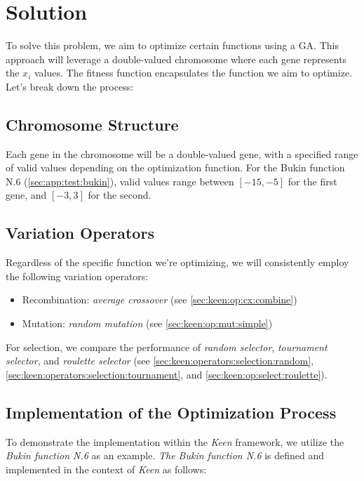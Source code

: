 \section{Solution}
\label{sec:fn_opt:sol}
    To solve this problem, we aim to optimize certain functions using a GA. This approach will leverage a double-valued 
    chromosome where each gene represents the \(x_i\) values. The fitness function encapsulates the function we aim to 
    optimize. Let's break down the process:

    \subsection{Chromosome Structure}
        Each gene in the chromosome will be a double-valued gene, with a specified 
        range of valid values depending on the optimization function. For the Bukin 
        function N.6 (\vref{sec:app:test:bukin}), valid values range between 
        \([-15, -5]\) for the first gene, and \([-3, 3]\) for the second.

    \subsection{Variation Operators}
        Regardless of the specific function we're optimizing, we will consistently 
        employ the following variation operators:

        \begin{itemize}
        \item Recombination: \textit{average crossover} (see 
            \vref{sec:keen:op:cx:combine})
        \item Mutation: \textit{random mutation} (see 
            \vref{sec:keen:op:mut:simple})
        \end{itemize}

        For selection, we compare the performance of \textit{random selector}, 
        \textit{tournament selector}, and \textit{roulette selector} (see 
        \vref{sec:keen:operators:selection:random}, 
        \vref{sec:keen:operators:selection:tournament}, and 
        \vref{sec:keen:op:select:roulette}).

    \subsection{Implementation of the Optimization Process}
        To demonstrate the implementation within the \textit{Keen} framework, we utilize the \textit{Bukin function N.6} 
        as an example. \textit{The Bukin function N.6} is defined and implemented in the context of \textit{Keen} as 
        follows:

